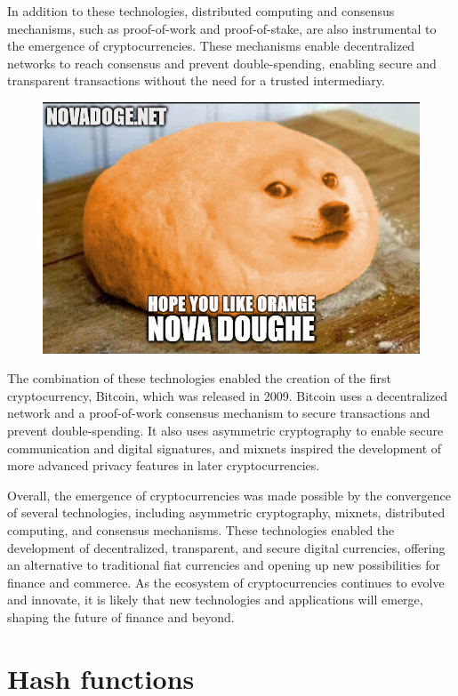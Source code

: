 \documentclass[a4paper, 10pt]{article}
\begin{document}
In addition to these technologies, distributed computing and consensus mechanisms, such as proof-of-work and proof-of-stake, are also instrumental to the emergence of cryptocurrencies. These mechanisms enable decentralized networks to reach consensus and prevent double-spending, enabling secure and transparent transactions without the need for a trusted intermediary.

\begin{figure}[!h]
  \centering
  \includegraphics[width=0.75\linewidth]{2.png}
  \end{figure}

The combination of these technologies enabled the creation of the first cryptocurrency, Bitcoin, which was released in 2009. Bitcoin uses a decentralized network and a proof-of-work consensus mechanism to secure transactions and prevent double-spending. It also uses asymmetric cryptography to enable secure communication and digital signatures, and mixnets inspired the development of more advanced privacy features in later cryptocurrencies.

Overall, the emergence of cryptocurrencies was made possible by the convergence of several technologies, including asymmetric cryptography, mixnets, distributed computing, and consensus mechanisms. These technologies enabled the development of decentralized, transparent, and secure digital currencies, offering an alternative to traditional fiat currencies and opening up new possibilities for finance and commerce. As the ecosystem of cryptocurrencies continues to evolve and innovate, it is likely that new technologies and applications will emerge, shaping the future of finance and beyond.

\section{Hash functions}\label{Hash Functions}
\end{document}

